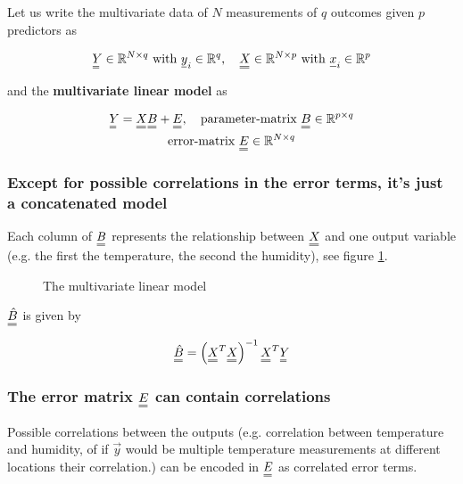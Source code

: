 Let us write the multivariate data of $N$ measurements of $q$ outcomes given
$p$ predictors as

\begin{equation}
    \mat{Y} \in \mathbb{R}^{N \times q} \text{ with } \vec{y}_i \in \mathbb{R}^q, \quad \mat{X} \in \mathbb{R}^{N \times p} \text{ with } \vec{x}_i \in \mathbb{R}^p
\end{equation}

and the \textbf{multivariate linear model} as

\begin{equation}
    \begin{gathered}  
        \mat{Y} = \mat{X} \mat{B} + \mat{E}, \quad \text{parameter-matrix } \mat{B} \in \mathbb{R}^{p \times q} \\
        \text{error-matrix } \mat{E} \in \mathbb{R}^{N \times q}
    \end{gathered}
\end{equation}

\subsubsection{Except for possible correlations in the error terms, it's just a concatenated model}
Each column of $\mat{B}$ represents the relationship between $\mat{X}$ and
one output variable (e.g. the first the temperature, the second the humidity), see
figure \ref{fig:multivariate_model}.

\begin{figure}[!htb]
 \centering
 \hfill
 \caption{The multivariate linear model}
 \label{fig:multivariate_model}
\end{figure}

$\mat{\hat{B}}$ is given by

\begin{equation}
    \mat{\hat{B}} = \left( \mat{X}^T \mat{X} \right)^{-1} \mat{X}^T \mat{Y}
\end{equation}

\subsubsection{The error matrix $\mat{E}$ can contain correlations}
Possible correlations between the outputs (e.g. correlation between temperature
and humidity, of if $\vec{y}$ would be multiple temperature measurements
at different locations their correlation.) can be encoded in $\mat{E}$ as
correlated error terms.

